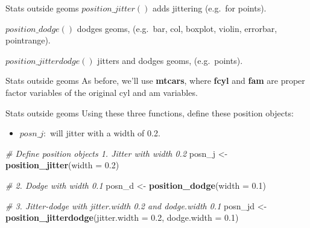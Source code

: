 \documentclass[
  ignorenonframetext,
]{beamer}
\newenvironment{Shaded}{\begin{snugshade}}{\end{snugshade}}
\newcommand{\AttributeTok}[1]{\textcolor[rgb]{0.13,0.29,0.53}{#1}}
\newcommand{\CommentTok}[1]{\textcolor[rgb]{0.56,0.35,0.01}{\textit{#1}}}
\newcommand{\FloatTok}[1]{\textcolor[rgb]{0.00,0.00,0.81}{#1}}
\newcommand{\FunctionTok}[1]{\textcolor[rgb]{0.13,0.29,0.53}{\textbf{#1}}}
\newcommand{\NormalTok}[1]{#1}
\newcommand{\OtherTok}[1]{\textcolor[rgb]{0.56,0.35,0.01}{#1}}
\providecommand{\tightlist}{%
  \setlength{\itemsep}{0pt}\setlength{\parskip}{0pt}}
\begin{document}
\begin{frame}{Stats outside geoms}
\label{stats-outside-geoms-1}
\(position\_jitter()\) adds jittering (e.g.~for points).

\(position\_dodge()\) dodges geoms, (e.g.~bar, col, boxplot, violin,
errorbar, pointrange).

\(position\_jitterdodge()\) jitters and dodges geoms, (e.g.~points).
\end{frame}

\begin{frame}{Stats outside geoms}
\label{stats-outside-geoms-2}
As before, we'll use \textbf{mtcars}, where \textbf{fcyl} and
\textbf{fam} are proper factor variables of the original cyl and am
variables.
\end{frame}

\begin{frame}[fragile]{Stats outside geoms}
\label{stats-outside-geoms-3}
Using these three functions, define these position objects:

\begin{itemize}
\tightlist
\item
  \(posn\_j:\) will jitter with a width of 0.2.
\end{itemize}


\begin{Shaded}
\begin{Highlighting}[]
\CommentTok{\# Define position objects 1. Jitter with width 0.2}
\NormalTok{posn\_j }\OtherTok{\textless{}{-}} \FunctionTok{position\_jitter}\NormalTok{(}\AttributeTok{width =} \FloatTok{0.2}\NormalTok{)}

\CommentTok{\# 2. Dodge with width 0.1}
\NormalTok{posn\_d }\OtherTok{\textless{}{-}} \FunctionTok{position\_dodge}\NormalTok{(}\AttributeTok{width =} \FloatTok{0.1}\NormalTok{)}

\CommentTok{\# 3. Jitter{-}dodge with jitter.width 0.2 and dodge.width 0.1}
\NormalTok{posn\_jd }\OtherTok{\textless{}{-}} \FunctionTok{position\_jitterdodge}\NormalTok{(}\AttributeTok{jitter.width =} \FloatTok{0.2}\NormalTok{, }\AttributeTok{dodge.width =} \FloatTok{0.1}\NormalTok{)}
\end{Highlighting}
\end{Shaded}
\end{frame}
\end{document}
